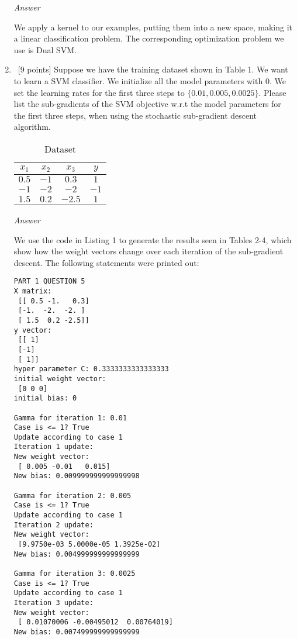 \documentclass[12pt, fullpage,letterpaper]{article}
\begin{document}
\begin{enumerate}
    \emph{Answer}
    
    We apply a kernel to our examples, putting them into a new space, making it a linear classification problem. The corresponding optimization problem we use is Dual SVM.
		
	\item~[9 points] Suppose we have the training dataset shown in Table 1. We want to learn a SVM classifier. We initialize all the model parameters with $0$. We set the learning rates for the first three steps to $\{0.01, 0.005, 0.0025\}$.  Please list the sub-gradients of the SVM objective w.r.t the model parameters for the first three steps, when using the stochastic sub-gradient descent algorithm. 
	\begin{table}[h]
		\centering
		\begin{tabular}{ccc|c}
			$x_1$ & $x_2$ & $x_3$ &  $y$\\ 
			\hline\hline
			$0.5$ & $-1$ & $0.3$ & $1$ \\ \hline
			$-1$ & $-2$ & $-2$ & $-1$\\ \hline
			$1.5$ & $0.2$ & $-2.5$ & $1$\\ \hline
		\end{tabular}
	\caption{Dataset}
	\end{table}
	
	\emph{Answer}
	
	We use the code in Listing 1 to generate the results seen in Tables 2-4, which show how the weight vectors change over each iteration of the sub-gradient descent. The following statements were printed out:
\begin{verbatim}
PART 1 QUESTION 5
X matrix:
 [[ 0.5 -1.   0.3]
 [-1.  -2.  -2. ]
 [ 1.5  0.2 -2.5]]
y vector:
 [[ 1]
 [-1]
 [ 1]]
hyper parameter C: 0.3333333333333333
initial weight vector:
 [0 0 0]
initial bias: 0

Gamma for iteration 1: 0.01
Case is <= 1? True
Update according to case 1
Iteration 1 update:
New weight vector:
 [ 0.005 -0.01   0.015]
New bias: 0.009999999999999998

Gamma for iteration 2: 0.005
Case is <= 1? True
Update according to case 1
Iteration 2 update:
New weight vector:
 [9.9750e-03 5.0000e-05 1.3925e-02]
New bias: 0.004999999999999999

Gamma for iteration 3: 0.0025
Case is <= 1? True
Update according to case 1
Iteration 3 update:
New weight vector:
 [ 0.01070006 -0.00495012  0.00764019]
New bias: 0.007499999999999999
    

\end{verbatim}
\end{enumerate}
\end{document}
